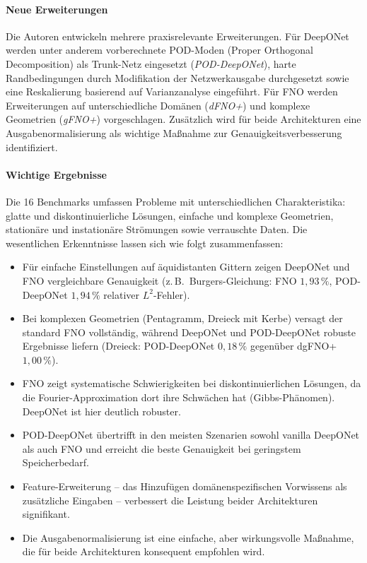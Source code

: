\documentclass[a4paper,12pt]{article}
\begin{document}
\paragraph{Neue Erweiterungen} Die Autoren entwickeln mehrere praxisrelevante
Erweiterungen. F\"ur DeepONet werden unter anderem vorberechnete
POD-Moden (Proper Orthogonal Decomposition) als Trunk-Netz eingesetzt
(\emph{POD-DeepONet}), harte Randbedingungen durch Modifikation der
Netzwerkausgabe durchgesetzt sowie eine Reskalierung basierend auf
Varianzanalyse eingef\"uhrt. F\"ur FNO werden Erweiterungen auf
unterschiedliche Dom\"anen (\emph{dFNO+}) und komplexe Geometrien
(\emph{gFNO+}) vorgeschlagen. Zus\"atzlich wird f\"ur beide Architekturen
eine Ausgabenormalisierung als wichtige Ma\ss{}nahme zur
Genauigkeitsverbesserung identifiziert.

\paragraph{Wichtige Ergebnisse} Die 16 Benchmarks umfassen Probleme mit
unterschiedlichen Charakteristika: glatte und diskontinuierliche L\"osungen,
einfache und komplexe Geometrien, station\"are und instation\"are Str\"omungen
sowie verrauschte Daten. Die wesentlichen Erkenntnisse lassen sich wie
folgt zusammenfassen:

\begin{itemize}
  \item F\"ur einfache Einstellungen auf \"aquidistanten Gittern zeigen
    DeepONet und FNO vergleichbare Genauigkeit (z.\,B.\ Burgers-Gleichung:
    FNO $1{,}93\,\%$, POD-DeepONet $1{,}94\,\%$ relativer $L^2$-Fehler).

  \item Bei komplexen Geometrien (Pentagramm, Dreieck mit Kerbe) versagt
    der standard FNO vollst\"andig, w\"ahrend DeepONet und POD-DeepONet
    robuste Ergebnisse liefern (Dreieck: POD-DeepONet $0{,}18\,\%$
    gegenüber dgFNO+ $1{,}00\,\%$).

  \item FNO zeigt systematische Schwierigkeiten bei diskontinuierlichen
    L\"osungen, da die Fourier-Approximation dort ihre Schw\"achen hat
    (Gibbs-Ph\"anomen). DeepONet ist hier deutlich robuster.

  \item POD-DeepONet \"ubertrifft in den meisten Szenarien sowohl
    vanilla DeepONet als auch FNO und erreicht die beste Genauigkeit
    bei geringstem Speicherbedarf.

  \item Feature-Erweiterung -- das Hinzuf\"ugen dom\"anenspezifischen
    Vorwissens als zus\"atzliche Eingaben -- verbessert die Leistung
    beider Architekturen signifikant.

  \item Die Ausgabenormalisierung ist eine einfache, aber wirkungsvolle
    Ma\ss{}nahme, die f\"ur beide Architekturen konsequent empfohlen wird.
\end{itemize}
\end{document}
